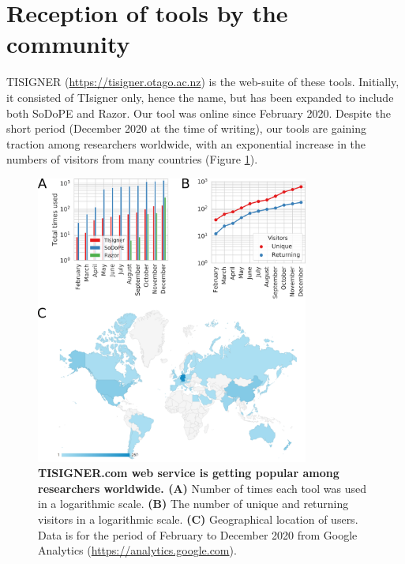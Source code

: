 \section{Reception of tools by the community}
TISIGNER (\href{https://tisigner.otago.ac.nz}{https://tisigner.otago.ac.nz}) is the web-suite of these tools. Initially, it consisted of TIsigner only, hence the name, but has been expanded to include both SoDoPE and Razor. Our tool was online since February 2020. Despite the short period (December 2020 at the time of writing), our tools are gaining traction among researchers worldwide, with an exponential increase in the numbers of visitors from many countries (Figure \ref{fig:tisigner_stats}).


\begin{figure}[H]
\center
\includegraphics[width=0.8\textwidth]{chapters/Discussion/Figures/tisigner_stats.png}
\caption[TISIGNER.com web service is getting popular among researchers worldwide.]{\textbf{TISIGNER.com web service is getting popular among researchers worldwide. (A)} Number of times each tool was used in a logarithmic scale. \textbf{(B)} The number of unique and returning visitors in a logarithmic scale. \textbf{(C)} Geographical location of users. Data is for the period of February to December 2020 from Google Analytics (\href{https://analytics.google.com}{https://analytics.google.com}). }%
\label{fig:tisigner_stats}
\end{figure}


